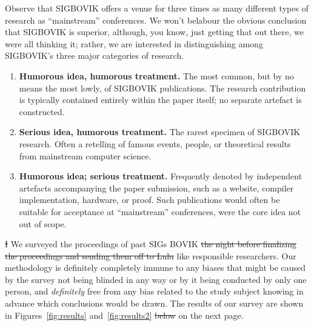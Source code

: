 \documentclass[12pt]{article}
\begin{document}
Observe that SIGBOVIK offers a venue for three times as many different types of research as ``mainstream'' conferences. We won't belabour the obvious conclusion that SIGBOVIK is superior, although, you know, just getting that out there, we were all thinking it; rather, we are interested in distinguishing among SIGBOVIK's three major categories of research.
\begin{enumerate}
\item {\bf Humorous idea, humorous treatment.} The most common, but by no means the most lowly, of SIGBOVIK publications. The research contribution is typically contained entirely within the paper itself; no separate artefact is constructed.
\item {\bf Serious idea, humorous treatment.} The rarest specimen of SIGBOVIK research. Often a retelling of famous events, people, or theoretical results from mainstream computer science.
\item {\bf Humorous idea; serious treatment.} Frequently denoted by independent artefacts accompanying the paper submission, such as a website, compiler implementation, hardware, or proof. Such publications would often be suitable for acceptance at ``mainstream'' conferences, were the core idea not out of scope.
\end{enumerate}

\sout{I} We surveyed the proceedings of past SIGs BOVIK \sout{the night before finalizing the proceedings and sending them off to Lulu} like responsible researchers.
Our methodology is definitely completely immune to any biases that might be caused by the survey not being blinded in any way or by it being conducted by only one person, and {\em definitely} free from any bias related to the study subject knowing in advance which conclusions would be drawn.
The results of our survey are shown in Figures~\ref{fig:results} and~\ref{fig:results2} \sout{below} on the next page.
\end{document}
